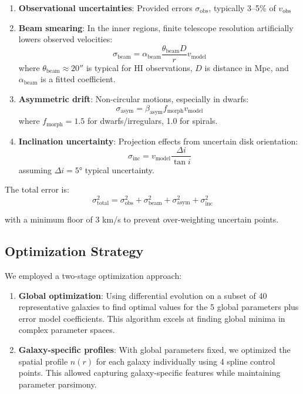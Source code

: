 \documentclass[twocolumn,prd,amsmath,amssymb,aps,superscriptaddress,nofootinbib]{revtex4-2}
\begin{document}
\begin{enumerate}
\item \textbf{Observational uncertainties}: Provided errors $\sigma_{\text{obs}}$, typically 3--5\% of $v_{\text{obs}}$
\item \textbf{Beam smearing}: In the inner regions, finite telescope resolution artificially lowers observed velocities:
\begin{equation}
\sigma_{\text{beam}} = \alpha_{\text{beam}} \frac{\theta_{\text{beam}} D}{r} v_{\text{model}}
\end{equation}
where $\theta_{\text{beam}} \approx 20''$ is typical for HI observations, $D$ is distance in Mpc, and $\alpha_{\text{beam}}$ is a fitted coefficient.

\item \textbf{Asymmetric drift}: Non-circular motions, especially in dwarfs:
\begin{equation}
\sigma_{\text{asym}} = \beta_{\text{asym}} f_{\text{morph}} v_{\text{model}}
\end{equation}
where $f_{\text{morph}} = 1.5$ for dwarfs/irregulars, 1.0 for spirals.

\item \textbf{Inclination uncertainty}: Projection effects from uncertain disk orientation:
\begin{equation}
\sigma_{\text{inc}} = v_{\text{model}} \frac{\Delta i}{\tan i}
\end{equation}
assuming $\Delta i = 5°$ typical uncertainty.
\end{enumerate}

The total error is:
\begin{equation}
\sigma_{\text{total}}^2 = \sigma_{\text{obs}}^2 + \sigma_{\text{beam}}^2 + \sigma_{\text{asym}}^2 + \sigma_{\text{inc}}^2
\end{equation}

with a minimum floor of 3 km/s to prevent over-weighting uncertain points.

\subsection{Optimization Strategy}

We employed a two-stage optimization approach:

\begin{enumerate}
\item \textbf{Global optimization}: Using differential evolution \cite{Storn1997} on a subset of 40 representative galaxies to find optimal values for the 5 global parameters plus error model coefficients. This algorithm excels at finding global minima in complex parameter spaces.

\item \textbf{Galaxy-specific profiles}: With global parameters fixed, we optimized the spatial profile $n(r)$ for each galaxy individually using 4 spline control points. This allowed capturing galaxy-specific features while maintaining parameter parsimony.
\end{enumerate}
\end{document}
